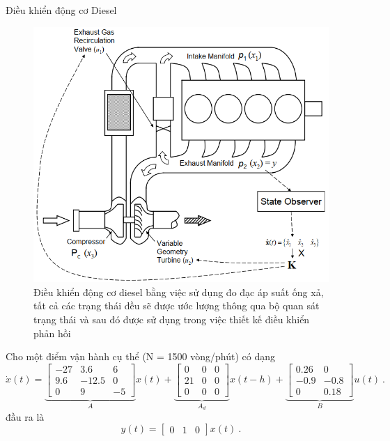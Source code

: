 \documentclass[10pt,notheorems]{beamer}
\theoremstyle{definition}
\theoremstyle{definition}
\theoremstyle{definition}
\newcommand{\m}[1]{
	\begin{bmatrix}
		#1
\end{bmatrix}}
\begin{document}
\begin{frame}{Điều khiển động cơ Diesel}
	\begin{figure}[h!]
		\centering
		\includegraphics[scale=0.3]{hinh/diesel_engine_control}
		\caption{Điều khiển động cơ diesel bằng việc sử dụng đo đạc áp suất ống xả, tất cả các trạng thái đều sẽ được ước lượng thông qua bộ quan sát trạng thái và sau đó được sử dụng trong việc thiết kế điều khiển phản hồi }
		\label{fig:dieselenginecontrol}
	\end{figure}
\end{frame}


\begin{frame}
	Cho một điểm vận hành cụ thể (N = 1500 vòng/phút) có dạng
	\begin{equation*}\label{eq7}
	\dot{x}(t) = \underbrace{\m{-27 & 3.6 & 6 \\ 9.6 & -12.5 & 0 \\ 0 & 9 & -5}}_{A} {x}(t) +   
	\underbrace{\m{0 & 0 & 0 \\ 21 & 0 & 0 \\0 & 0 & 0 }}_{A_d} {x}(t-h) + 
	\underbrace{\m{0.26 & 0 \\ -0.9 & -0.8 \\ 0 & 0.18}}_{B} {u}(t)  \ .
	\end{equation*}
	 đầu ra là
	\begin{equation*}\label{eq5}
	y(t) = \m{0 & 1 & 0} x(t) \ .
	\end{equation*}
	
\end{frame}
\end{document}
